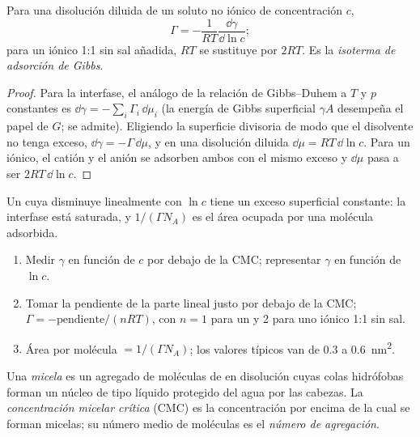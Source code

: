 \begin{theorem}\label{thm:b3:colloids:gibbs-adsorption}
Para una disolución diluida de un soluto no iónico de concentración $c$,
\[
  \Gamma = -\frac{1}{RT}\frac{\dd\gamma}{\dd\ln c};
\]
para un  iónico 1:1 sin sal añadida, $RT$ se sustituye por $2RT$. Es
la \emph{isoterma de adsorción de Gibbs}.
\end{theorem}

\begin{proof}
Para la interfase, el análogo de la relación de Gibbs--Duhem a $T$ y
$p$ constantes es $\dd\gamma = -\sum_i\Gamma_i\,\dd\mu_i$ (la energía de Gibbs superficial $\gamma A$ desempeña el papel de $G$;
se admite). Eligiendo la superficie divisoria de modo que el disolvente no tenga exceso,
$\dd\gamma = -\Gamma\,\dd\mu$, y en una disolución diluida $\dd\mu = RT\,\dd\ln c$. Para un  iónico,
el catión y el anión se adsorben ambos con el mismo exceso y $\dd\mu$ pasa a ser
$2RT\,\dd\ln c$.
\end{proof}

Un  cuya  disminuye linealmente con $\ln c$ tiene un exceso
superficial constante: la interfase está saturada, y $1/(\Gamma N_A)$ es el área ocupada por
una molécula adsorbida.

\begin{method}\label{met:b3:colloids:surface-excess}
\begin{enumerate}
  \item Medir $\gamma$ en función de $c$ por debajo de la CMC; representar $\gamma$ en función de $\ln c$.
  \item Tomar la pendiente de la parte lineal justo por debajo de la CMC; $\Gamma = -\text{pendiente}/(nRT)$, con $n
        = 1$ para un  y 2 para uno iónico 1:1 sin sal.
  \item Área por molécula $= 1/(\Gamma N_A)$; los valores típicos van de 0.3 a \qty{0.6}{nm^2}.
\end{enumerate}
\end{method}

\begin{definition}\label{def:b3:colloids:micelle}
Una \emph{micela} es un agregado de moléculas de  en disolución
cuyas colas hidrófobas forman un núcleo de tipo líquido protegido del agua por las
cabezas. La \emph{concentración micelar crítica}
(CMC) es la concentración por encima de la cual se forman micelas; su
número medio de moléculas es el \emph{número de agregación}.
\end{definition}

